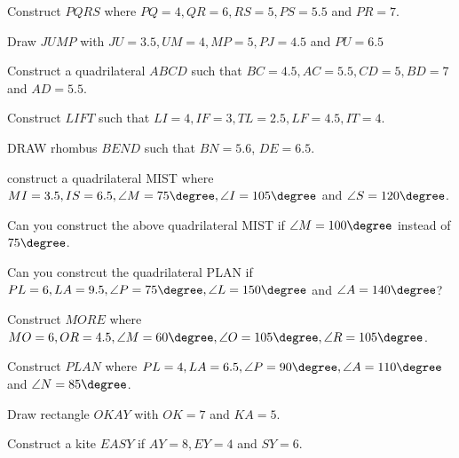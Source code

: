 

\item Construct $PQRS$ where $PQ = 4, QR = 6, RS = 5, PS = 5.5$ and $PR = 7$.
\item Draw $JUMP$ with $JU = 3.5, UM=4, MP = 5, PJ =4.5$ and $PU = 6.5$
\item Construct a quadrilateral $ABCD$ such that $BC=4.5,  AC = 5.5, CD = 5, BD = 7$ and $AD = 5.5$.
\item Construct $LIFT$ such that $LI = 4, IF = 3, TL = 2.5, LF = 4.5, IT=4$.
\\
\solution
%

\item DRAW rhombus $BEND$ such that $BN = 5.6$, $DE = 6.5$.
\\
\solution

\item construct a quadrilateral MIST where $MI = 3.5, IS = 6.5, \angle M = 75 \degree, \angle I = 105 \degree$ and $\angle S = 120 \degree$.
\item Can you construct the above quadrilateral MIST if $\angle M = 100 \degree$ instead of $75 \degree$.
\item Can you constrcut the quadrilateral PLAN if $PL = 6, LA = 9.5, \angle P = 75 \degree, \angle L = 150 \degree$ and $\angle A = 140 \degree$?
\item Construct $MORE$ where $MO = 6, OR = 4.5, \angle M = 60 \degree, \angle O = 105 \degree, \angle R = 105 \degree$.
\item Construct $PLAN$ where $PL = 4, LA = 6.5, \angle P = 90 \degree, \angle A = 110\degree$ and $\angle N = 85\degree$.
\item Draw  rectangle $OKAY$ with $OK = 7$ and $KA = 5$.

\item Construct a kite $EASY$ if $AY = 8, EY = 4$ and $SY = 6$.


%
